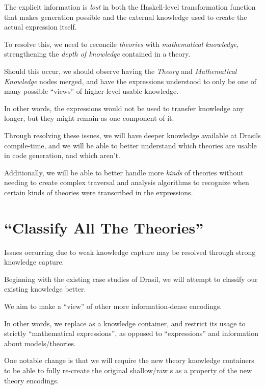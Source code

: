 The explicit information is \textit{lost} in both the Haskell-level
transformation function that makes generation possible and the external
knowledge used to create the actual expression itself.

To resolve this, we need to reconcile \textit{theories} with
\textit{mathematical knowledge}, strengthening the \textit{depth of knowledge}
contained in a theory.

Should this occur, we should observe  having the
\textit{Theory} and \textit{Mathematical Knowledge} nodes merged, and have the
expressions understood to only be one of many possible ``views'' of higher-level
usable knowledge.

In other words, the expressions would not be used to transfer knowledge any
longer, but they might remain as one component of it.

Through resolving these issues, we will have deeper knowledge available at
Drasils compile-time, and we will be able to better understand which theories
are usable in code generation, and which aren't.

Additionally, we will be able to better handle more \textit{kinds} of theories
without needing to create complex traversal and analysis algorithms to recognize
when certain kinds of theories were transcribed in the expressions.




\section{\textquotedblleft{}Classify All The Theories\textquotedblright{}}

Issues occurring due to weak knowledge capture may be resolved through strong
knowledge capture.

Beginning with the existing case studies of Drasil, we will attempt to classify
our existing knowledge better.

We aim to make \RelationConcept{} a ``view'' of other more information-dense
encodings.

In other words, we replace \Expr{} as a knowledge container, and restrict its
usage to strictly ``mathematical expressions'', as opposed to ``expressions''
and information about models/theories.

One notable change is that we will require the new theory knowledge containers
to be able to fully re-create the original shallow/raw \Expr{}s as a property of
the new theory encodings.


